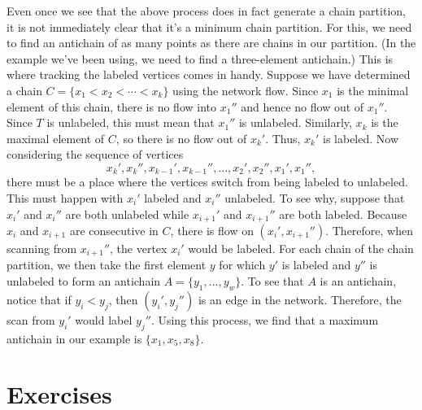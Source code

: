 Even once we see that the above process does in fact generate a chain
partition, it is not immediately clear that it's a minimum chain
partition. For this, we need to find an antichain of as many points as
there are chains in our partition. (In the example we've been using,
we need to find a three-element antichain.) This is where tracking
the labeled vertices comes in handy. Suppose we have determined a
chain $C=\{x_1<x_2<\cdots < x_k\}$ using the network flow. Since $x_1$
is the minimal element of this chain, there is no flow into $x_1''$
and hence no flow out of $x_1''$. Since $T$ is unlabeled, this must
mean that $x_1''$ is unlabeled. Similarly, $x_k$ is the maximal
element of $C$, so there is no flow out of $x_k'$. Thus, $x_k'$ is
labeled. Now considering the sequence of vertices
\[x_k',x_k'',x_{k-1}',x_{k-1}'',\dots,x_2',x_2'',x_1',x_1'',\] there
must be a place where the vertices switch from being labeled to
unlabeled. This must happen with $x_i'$ labeled and $x_i''$
unlabeled. To see why, suppose that $x_i'$ and $x_i''$ are both
unlabeled while $x_{i+1}'$ and $x_{i+1}''$ are both labeled. Because
$x_i$ and $x_{i+1}$ are consecutive in $C$, there is flow on
$(x_i',x_{i+1}'')$. Therefore, when scanning from $x_{i+1}''$, the
vertex $x_i'$ would be labeled. For each chain of the chain partition,
we then take the first element $y$ for which $y'$ is labeled and $y''$
is unlabeled to form an antichain $A=\{y_1,\dots,y_w\}$. To see that
$A$ is an antichain, notice that if $y_i<y_j$, then $(y_i',y_j'')$ is
an edge in the network. Therefore, the scan from $y_i'$ would label
$y_j''$. Using this process, we find that a maximum antichain in our
example is $\{x_1,x_5,x_8\}$.

\section{Exercises}\label{s:flowapplications:exercises}

